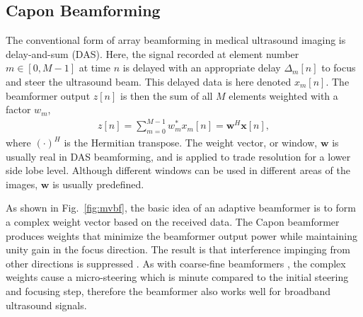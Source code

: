 \documentclass[journal]{IEEEtran}
\renewcommand{\vec}[1]{\mathbf{#1}}
\begin{document}
\subsection{Capon Beamforming}\label{sec:es-capon}






The conventional form of array beamforming in medical ultrasound imaging is delay-and-sum (DAS). Here, the signal recorded at element number $m \in [0,M-1]$ at time $n$ is delayed with an appropriate delay $\Delta_m[n]$ to focus and steer the ultrasound beam. This delayed data is here denoted $x_m[n]$. The beamformer output $z[n]$ is then the sum of all $M$ elements weighted with a factor $w_m$,
\begin{align}
z[n] = \sum_{m = 0}^{M-1}w_m^*x_m[n] = \vec{w}^H\vec{x}[n], \label{eq:z}
\end{align}
where $(\cdot)^H$ is the Hermitian transpose. The weight vector, or window, $\vec{w}$ is usually real in DAS beamforming, and is applied to trade resolution for a lower side lobe level. Although different windows can be used in different areas of the images, $\vec{w}$ is usually predefined.

As shown in Fig.\ \ref{fig:mvbf}, the basic idea of an adaptive beamformer is to form a complex weight vector based on the received data.   The Capon beamformer produces weights that minimize the beamformer output power while maintaining unity gain in the focus direction. The result is that interference impinging from other directions is suppressed \cite{Synnevag2007}. As with coarse-fine beamformers \cite{Thomenius}, the complex weights cause a micro-steering which is minute compared to the initial steering and focusing step, therefore the beamformer also works well for broadband ultrasound signals.
\end{document}
